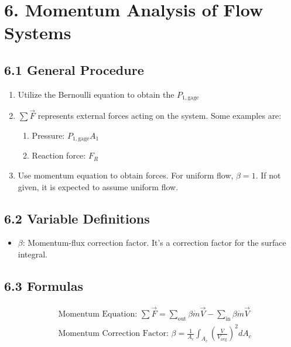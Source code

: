 \section*{6. Momentum Analysis of Flow Systems}
\subsection*{6.1 General Procedure}
\begin{enumerate}
    \item Utilize the Bernoulli equation to obtain the $P_{1, \text{gage}}$
    \item $\sum \vec{F}$ represents external forces acting on the system. Some examples are:
    \begin{enumerate}[label=\roman*)]
        \item Pressure: $P_{1, \text{gage}} A_1$
        \item Reaction force: $F_{R}$
    \end{enumerate}
    \item Use momentum equation to obtain forces. For uniform flow, $\beta = 1$.  If not given, 
    it is expected to assume uniform flow.
\end{enumerate}

\subsection*{6.2 Variable Definitions}
\begin{itemize}
    \item $\beta$: Momentum-flux correction factor. It's a correction factor for the surface integral.
\end{itemize}

\subsection*{6.3 Formulas}
\begin{fleqn}
    \begin{align*}
        &\text{Momentum Equation: } \sum \vec{F} = \sum_{\text{out}} \beta \dot{m} \vec{V} - \sum_{\text{in}} \beta \dot{m} \vec{V} \\
        &\text{Momentum Correction Factor: } \beta = \frac{1}{A_c} \int_{A_c} \left(\frac{V}{V_{\text{avg}}}\right)^2 dA_c 
    \end{align*}
\end{fleqn}